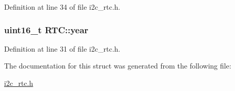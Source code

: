 Definition at line 34 of file i2c\-\_\-rtc.\-h.

\hypertarget{structRTC_a94d8ae49bff6a2df2b9ff8e390f57dc7}{
\subsubsection[{year}]{\setlength{\rightskip}{0pt plus 5cm}uint16\-\_\-t R\-T\-C\-::year}}\label{structRTC_a94d8ae49bff6a2df2b9ff8e390f57dc7}


Definition at line 31 of file i2c\-\_\-rtc.\-h.



The documentation for this struct was generated from the following file\-:\begin{DoxyCompactItemize}
\item 
\hyperlink{i2c__rtc_8h}{i2c\-\_\-rtc.\-h}\end{DoxyCompactItemize}
